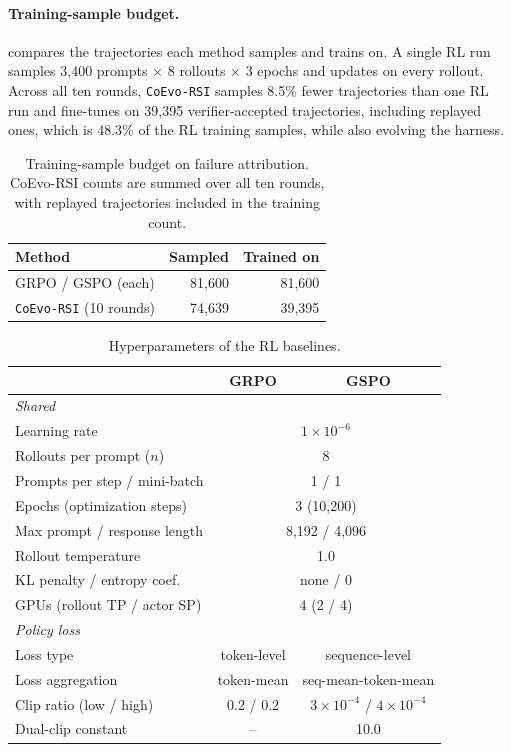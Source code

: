\documentclass[11pt,a4paper]{article}
\newcommand{\ourmethod}{\texttt{CoEvo-RSI}}
\begin{document}
\paragraph{Training-sample budget.}
 compares the trajectories each method samples and trains on. A single RL run samples 3,400 prompts $\times$ 8 rollouts $\times$ 3 epochs and updates on every rollout. Across all ten rounds, \ourmethod{} samples 8.5\% fewer trajectories than one RL run and fine-tunes on 39,395 verifier-accepted trajectories, including replayed ones, which is 48.3\% of the RL training samples, while also evolving the harness.

\begin{table}[t]
\centering
\footnotesize
\caption{Training-sample budget on failure attribution. CoEvo-RSI counts are summed over all ten rounds, with replayed trajectories included in the training count.}
\label{tab:app-budget}
\renewcommand{\arraystretch}{1.05}
\setlength{\tabcolsep}{4pt}
\begin{tabular}{lrr}
\toprule
\textbf{Method} & \textbf{Sampled} & \textbf{Trained on} \\
\midrule
GRPO / GSPO (each) & 81,600 & 81,600 \\
\ourmethod{} (10 rounds) & 74,639 & 39,395 \\
\bottomrule
\end{tabular}
\end{table}

\begin{table}[t]
\centering
\footnotesize
\caption{Hyperparameters of the RL baselines.}
\label{tab:app-rl}
\renewcommand{\arraystretch}{1.05}
\setlength{\tabcolsep}{4pt}
\begin{tabular}{lcc}
\toprule
& \textbf{GRPO} & \textbf{GSPO} \\
\midrule
\multicolumn{3}{l}{\textit{Shared}} \\
Learning rate & \multicolumn{2}{c}{$1\times10^{-6}$} \\
Rollouts per prompt ($n$) & \multicolumn{2}{c}{8} \\
Prompts per step / mini-batch & \multicolumn{2}{c}{1 / 1} \\
Epochs (optimization steps) & \multicolumn{2}{c}{3 (10,200)} \\
Max prompt / response length & \multicolumn{2}{c}{8,192 / 4,096} \\
Rollout temperature & \multicolumn{2}{c}{1.0} \\
KL penalty / entropy coef. & \multicolumn{2}{c}{none / 0} \\
GPUs (rollout TP / actor SP) & \multicolumn{2}{c}{4 (2 / 4)} \\
\midrule
\multicolumn{3}{l}{\textit{Policy loss}} \\
Loss type & token-level & sequence-level \\
Loss aggregation & token-mean & seq-mean-token-mean \\
Clip ratio (low / high) & 0.2 / 0.2 & $3\times10^{-4}$ / $4\times10^{-4}$ \\
Dual-clip constant & -- & 10.0 \\
\bottomrule
\end{tabular}
\end{table}
\end{document}
